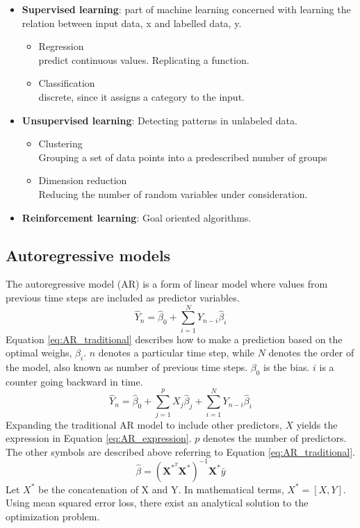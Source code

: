 \documentclass{article}
\begin{document}
\begin{itemize}
    \item \textbf{Supervised learning}: part of machine learning concerned with learning the relation between input data, x and labelled data, y.
    \begin{itemize}
        \item Regression\\predict continuous values. Replicating a function.
        \item Classification\\discrete, since it assigns a category to the input.
    \end{itemize}
    \item \textbf{Unsupervised learning}: Detecting patterns in unlabeled data.
    \begin{itemize}
        \item Clustering\\Grouping a set of data points into a predescribed number of groups
        \item Dimension reduction\\Reducing the number of random variables under consideration.
    \end{itemize}
    \item \textbf{Reinforcement learning}: Goal oriented algorithms.
\end{itemize}

\subsection{Autoregressive models} \label{sec:ARmodels}
The autoregressive model (AR) is a form of linear model where values from previous time steps are included as predictor variables. 
\begin{equation} \label{eq:AR_traditional}
    \hat{Y}_n = \hat{\beta}_0 + \sum_{i = 1}^{N} Y_{n-i} \hat{\beta}_{i}
\end{equation}
Equation \eqref{eq:AR_traditional} describes how to make a prediction based on the optimal weighs, $\beta_i$. $n$ denotes a particular time step, while $N$ denotes the order of the model, also known as number of previous time steps. $\beta_0$ is the bias. $i$ is a counter going backward in time.
\begin{equation} \label{eq:AR_expression}
    \hat{Y}_n = \hat{\beta}_0 + \sum_{j=1}^p X_j\hat{\beta}_j + \sum_{i = 1}^{N} Y_{n-i}\hat{\beta}_{i}
\end{equation}
Expanding the traditional AR model to include other predictors, $X$ yields the expression in Equation \ref{eq:AR_expression}. $p$ denotes the number of predictors. The other symbols are described above referring to Equation \ref{eq:AR_traditional}.
\begin{equation} \label{eq:AR_solution}
    \hat{ \beta } = \left( \textbf{X}^{*^T}\textbf{X}^* \right)^{-1}\textbf{X}^*\bar{y}
\end{equation}
Let $X^*$ be the concatenation of X and Y. In mathematical terms, $X^*=[X, Y]$. Using mean squared error loss, there exist an analytical solution to the optimization problem. 
\end{document}
